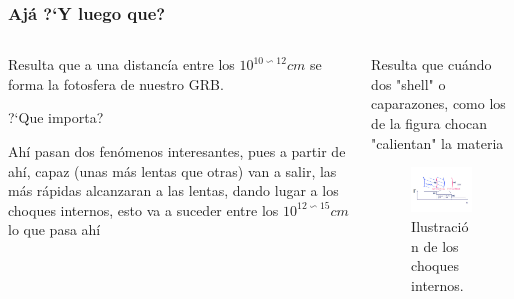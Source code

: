 \documentclass{beamer}
\begin{document}
\begin{frame}
\frametitle{Aj\'a ?`Y luego que?}
	\begin{columns}
		\begin{column}{5cm}
		Resulta que a una distanc\'ia entre los ${10^{10 \backsim 12} cm}$ se forma la
		fotosfera de nuestro GRB.
		
		?`Que importa?
		
		Ah\'i pasan dos fen\'omenos interesantes, pues a partir de ah\'i, capaz (unas m\'as lentas
		que otras) van a salir, las m\'as r\'apidas alcanzaran a las lentas, dando lugar a los choques
		internos, esto va a suceder entre los ${10^{12 \backsim 15} cm}$ lo que pasa ah\'i 
		
		\end{column}
		
		\begin{column}{5cm}
		
			Resulta que cu\'ando dos "shell" o caparazones, como los de la figura chocan "calientan" la materia
			\begin{figure}
				\centering
				\includegraphics[scale=0.25]{choques.jpg}
				\caption{Ilustraci\'on de los choques internos.}
			\end{figure}
		\end{column}	
	\end{columns}
\end{frame}


\end{document}
